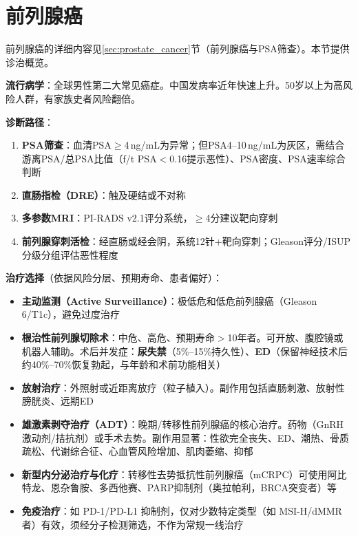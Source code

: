 \documentclass[12pt,a4paper,twoside]{ctexbook}
\begin{document}
\section{前列腺癌}


前列腺癌的详细内容见\ref{sec:prostate_cancer}节（前列腺癌与PSA筛查）。本节提供诊治概览。

\textbf{流行病学}：全球男性第二大常见癌症。中国发病率近年快速上升。50岁以上为高风险人群，有家族史者风险翻倍。

\textbf{诊断路径}：
\begin{enumerate}
	\item \textbf{PSA筛查}：血清PSA$\ge$4\,ng/mL为异常；但PSA4--10\,ng/mL为灰区，需结合游离PSA/总PSA比值（f/t PSA$<$0.16提示恶性）、PSA密度、PSA速率综合判断
	\item \textbf{直肠指检（DRE）}：触及硬结或不对称
	\item \textbf{多参数MRI}：PI-RADS v2.1评分系统，$\ge$4分建议靶向穿刺
	\item \textbf{前列腺穿刺活检}：经直肠或经会阴，系统12针+靶向穿刺；Gleason评分/ISUP分级分组评估恶性程度
\end{enumerate}

\textbf{治疗选择}（依据风险分层、预期寿命、患者偏好）：
\begin{itemize}[leftmargin=2cm]
	\item \textbf{主动监测（Active Surveillance）}：极低危和低危前列腺癌（Gleason 6/T1c），避免过度治疗
	\item \textbf{根治性前列腺切除术}：中危、高危、预期寿命$>$10年者。可开放、腹腔镜或机器人辅助。术后并发症：\textbf{尿失禁}（5\%--15\%持久性）、\textbf{ED}（保留神经技术后约40\%--70\%恢复勃起，与年龄和术前功能相关）
	\item \textbf{放射治疗}：外照射或近距离放疗（粒子植入）。副作用包括直肠刺激、放射性膀胱炎、远期ED
	\item \textbf{雄激素剥夺治疗（ADT）}：晚期/转移性前列腺癌的核心治疗。药物（GnRH激动剂/拮抗剂）或手术去势。副作用显著：性欲完全丧失、ED、潮热、骨质疏松、代谢综合征、心血管风险增加、肌肉萎缩、抑郁
	\item \textbf{新型内分泌治疗与化疗}：转移性去势抵抗性前列腺癌（mCRPC）可使用阿比特龙、恩杂鲁胺、多西他赛、PARP抑制剂（奥拉帕利，BRCA突变者）等
	\item \textbf{免疫治疗}：如 PD-1/PD-L1 抑制剂，仅对少数特定类型（如 MSI-H/dMMR 者）有效，须经分子检测筛选，不作为常规一线治疗
\end{itemize}
\end{document}
